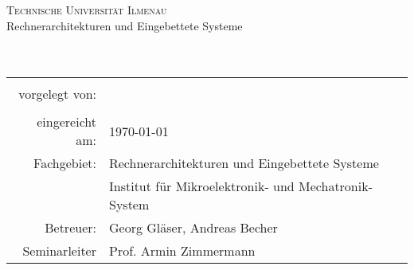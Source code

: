 
\begin{titlepage}
	\centering
	{\Large \textsc{Technische Universität Ilmenau}}\\[3ex]
	{\Large Rechnerarchitekturen und Eingebettete Systeme}\\[3ex]
	\vfill
	{\Large \textbf{\artderausarbeitung}}\\[4ex]
	{\large \textbf{\themaderarbeit}}\\[5ex]
	\vfill
	\begin{tabular}{rl}
		\hline\\
		vorgelegt von:          & \quad \namedesautorsI\\[1,5ex]
										       & \quad \namedesautorsII\\[1,5ex]
		eingereicht am:         & \quad 
		\today \\[1,5ex]
		Fachgebiet:            & \quad Rechnerarchitekturen und Eingebettete Systeme\\[0,5ex]
								& \quad Institut für Mikroelektronik- und Mechatronik-System\\[1,5ex]
		Betreuer:            	& \quad Georg Gläser, Andreas Becher \\[1,5ex]
		Seminarleiter           & \quad Prof. Armin Zimmermann \\[1,5ex]	
	\end{tabular}
	\vfill
	
    


\end{titlepage}